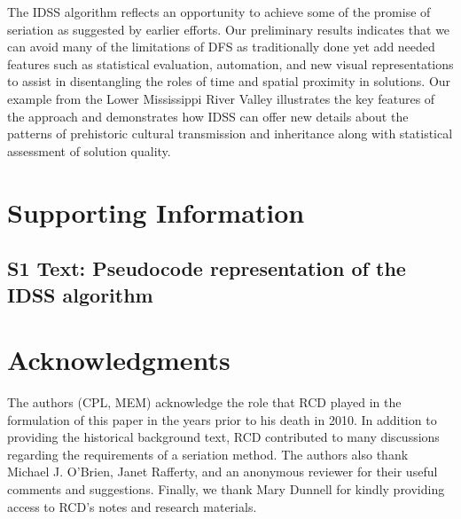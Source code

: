 \documentclass[10pt,letterpaper]{article}
\begin{document}
The IDSS algorithm reflects an opportunity to achieve some of the promise of seriation as suggested by earlier efforts. Our preliminary results indicates that we can avoid many of the limitations of DFS as traditionally done yet add needed features such as statistical evaluation, automation, and new visual representations to assist in disentangling the roles of time and spatial proximity in solutions. Our example from the Lower Mississippi River Valley illustrates the key features of the approach and demonstrates how IDSS can offer new details about the patterns of prehistoric cultural transmission and inheritance along with statistical assessment of solution quality. 

\clearpage
\section*{Supporting Information}
\label{S1_Text}
\subsection*{\textbf{S1 Text:}  Pseudocode representation of the IDSS algorithm}




\section*{Acknowledgments}
The authors (CPL, MEM) acknowledge the role that RCD played in the formulation of this paper in the years prior to his death in 2010. In addition to providing the historical background text, RCD contributed to many discussions regarding the requirements of a seriation method. The authors also thank Michael J. O'Brien, Janet Rafferty, and an anonymous reviewer for their useful comments and suggestions. Finally, we thank Mary Dunnell for kindly providing access to RCD’s notes and research materials. 


\nolinenumbers

%
%
% 
\end{document}
